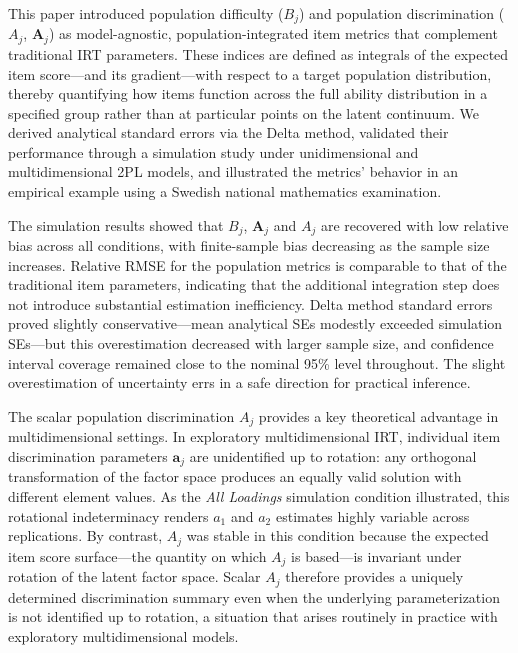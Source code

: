 \documentclass[man, 12pt, floatsintext]{apa7}
\begin{document}
This paper introduced population difficulty ($B_j$) and population discrimination ($A_j$, $\mathbf{A}_j$) as model-agnostic, population-integrated item metrics that complement traditional IRT parameters. These indices are defined as integrals of the expected item score---and its gradient---with respect to a target population distribution, thereby quantifying how items function across the full ability distribution in a specified group rather than at particular points on the latent continuum. We derived analytical standard errors via the Delta method, validated their performance through a simulation study under unidimensional and multidimensional 2PL models, and illustrated the metrics' behavior in an empirical example using a Swedish national mathematics examination.

The simulation results showed that $B_j$, $\mathbf{A}_j$ and $A_j$ are recovered with low relative bias across all conditions, with finite-sample bias decreasing as the sample size increases. Relative RMSE for the population metrics is comparable to that of the traditional item parameters, indicating that the additional integration step does not introduce substantial estimation inefficiency. Delta method standard errors proved slightly conservative---mean analytical SEs modestly exceeded simulation SEs---but this overestimation decreased with larger sample size, and confidence interval coverage remained close to the nominal 95\% level throughout. The slight overestimation of uncertainty errs in a safe direction for practical inference.

The scalar population discrimination $A_j$ provides a key theoretical advantage in multidimensional settings. In exploratory multidimensional IRT, individual item discrimination parameters $\mathbf{a}_j$ are unidentified up to rotation: any orthogonal transformation of the factor space produces an equally valid solution with different element values. As the \emph{All Loadings} simulation condition illustrated, this rotational indeterminacy renders $a_1$ and $a_2$ estimates highly variable across replications. By contrast, $A_j$ was stable in this condition because the expected item score surface---the quantity on which $A_j$ is based---is invariant under rotation of the latent factor space. Scalar $A_j$ therefore provides a uniquely determined discrimination summary even when the underlying parameterization is not identified up to rotation, a situation that arises routinely in practice with exploratory multidimensional models.
\end{document}
